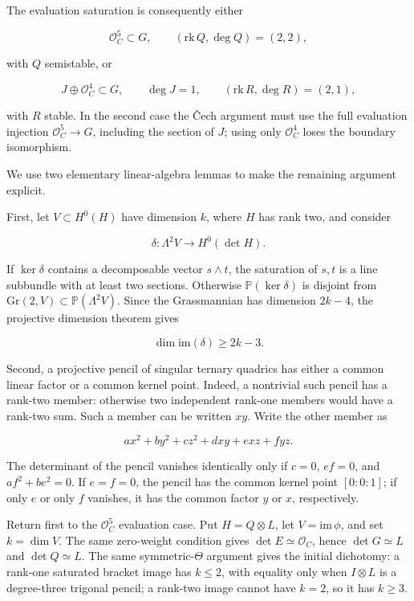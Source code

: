 \documentclass[11pt]{article}
\theoremstyle{definition}
\begin{document}
The evaluation saturation is consequently either

\[\mathcal O_C^5\subset G,\qquad
(\mathrm{rk}\,Q,\deg Q)=(2,2),\]

with \(Q\) semistable, or

\[J\oplus\mathcal O_C^4\subset G,\qquad
\deg J=1,\qquad
(\mathrm{rk}\,R,\deg R)=(2,1),\]

with \(R\) stable. In the second case the \v{C}ech argument must use the
full evaluation injection \(\mathcal O_C^5\to G\), including the section
of \(J\); using only \(\mathcal O_C^4\) loses the boundary isomorphism.

We use two elementary linear-algebra lemmas to make the remaining
argument explicit.

First, let \(V\subset H^0(H)\) have dimension \(k\), where \(H\) has
rank two, and consider

\[\delta:\Lambda^2V\longrightarrow H^0(\det H).\]

If \(\ker\delta\) contains a decomposable vector \(s\wedge t\), the
saturation of \(s,t\) is a line subbundle with at least two sections.
Otherwise \(\mathbb P(\ker\delta)\) is disjoint from
\(\mathrm{Gr}(2,V)\subset\mathbb P(\Lambda^2V)\). Since the Grassmannian
has dimension \(2k-4\), the projective dimension theorem gives

\[\dim\mathrm{im}(\delta)\ge2k-3.\]

Second, a projective pencil of singular ternary quadrics has either a
common linear factor or a common kernel point. Indeed, a nontrivial such
pencil has a rank-two member: otherwise two independent rank-one members
would have a rank-two sum. Such a member can be written \(xy\). Write
the other member as

\[ax^2+by^2+cz^2+dxy+exz+fyz.\]

The determinant of the pencil vanishes identically only if \(c=0\),
\(ef=0\), and \(af^2+be^2=0\). If \(e=f=0\), the pencil has the common
kernel point \([0:0:1]\); if only \(e\) or only \(f\) vanishes, it has
the common factor \(y\) or \(x\), respectively.

Return first to the \(\mathcal O_C^5\) evaluation case. Put
\(H=Q\otimes L\), let \(V=\mathrm{im}\,\phi\), and set \(k=\dim V\). The
same zero-weight condition gives \(\det E\simeq\mathcal O_C\), hence
\(\det G\simeq L\) and \(\det Q\simeq L\). The same symmetric-\(\Theta\)
argument gives the initial dichotomy: a rank-one saturated bracket image
has \(k\le2\), with equality only when \(I\otimes L\) is a degree-three
trigonal pencil; a rank-two image cannot have \(k=2\), so it has
\(k\ge3\).
\end{document}
